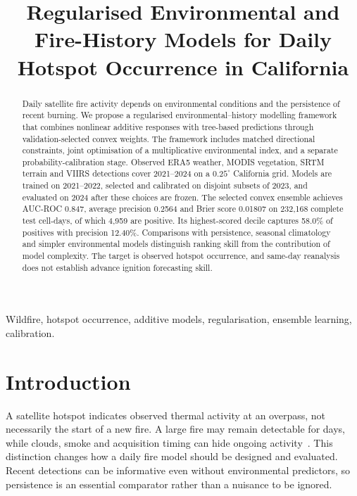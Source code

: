 \documentclass[conference]{IEEEtran}
\begin{document}
\title{Regularised Environmental and Fire-History Models for Daily Hotspot Occurrence in California}
\author{
\and{}}
\maketitle
\begin{abstract}
Daily satellite fire activity depends on environmental conditions and the persistence of recent burning. We propose a regularised environmental--history modelling framework that combines nonlinear additive responses with tree-based predictions through validation-selected convex weights. The framework includes matched directional constraints, joint optimisation of a multiplicative environmental index, and a separate probability-calibration stage. Observed ERA5 weather, MODIS vegetation, SRTM terrain and VIIRS detections cover 2021--2024 on a $0.25^\circ$ California grid. Models are trained on 2021--2022, selected and calibrated on disjoint subsets of 2023, and evaluated on 2024 after these choices are frozen. The selected convex ensemble achieves AUC-ROC 0.847, average precision 0.2564 and Brier score 0.01807 on 232,168 complete test cell-days, of which 4,959 are positive. Its highest-scored decile captures 58.0\% of positives with precision 12.40\%. Comparisons with persistence, seasonal climatology and simpler environmental models distinguish ranking skill from the contribution of model complexity. The target is observed hotspot occurrence, and same-day reanalysis does not establish advance ignition forecasting skill.
\end{abstract}
\begin{IEEEkeywords}
Wildfire, hotspot occurrence, additive models, regularisation, ensemble learning, calibration.
\end{IEEEkeywords}

\section{Introduction}
A satellite hotspot indicates observed thermal activity at an overpass, not necessarily the start of a new fire. A large fire may remain detectable for days, while clouds, smoke and acquisition timing can hide ongoing activity~\cite{viirs}. This distinction changes how a daily fire model should be designed and evaluated. Recent detections can be informative even without environmental predictors, so persistence is an essential comparator rather than a nuisance to be ignored.
\end{document}
